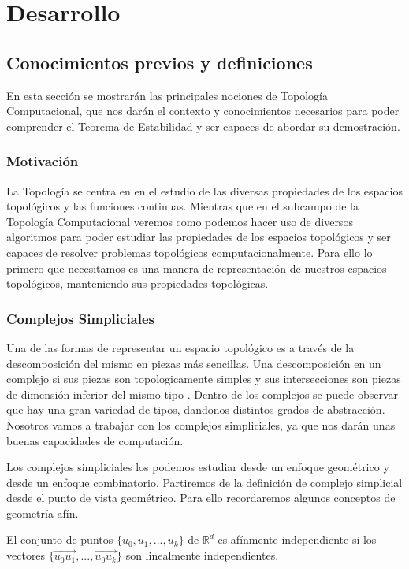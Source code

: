 \chapter{Desarrollo}

\section{Conocimientos previos y definiciones}
En esta sección se mostrarán las principales nociones de Topología Computacional, que nos darán el contexto y conocimientos necesarios para poder comprender el Teorema de Estabilidad y ser capaces de abordar su demostración.

\subsection{Motivación}
La Topología se centra en en el estudio de las diversas propiedades de los espacios topológicos y las funciones continuas. Mientras que en el subcampo de la Topología Computacional veremos como podemos hacer uso de diversos algoritmos para poder estudiar las propiedades de los espacios topológicos y ser capaces de resolver problemas topológicos computacionalmente. Para ello lo primero que necesitamos es una manera de representación de nuestros espacios topológicos, manteniendo sus propiedades topológicas.

\subsection{Complejos Simpliciales}
Una de las formas de representar un espacio topológico es a través de la descomposición del mismo en piezas más sencillas. Una descomposición en un complejo si sus piezas son topologicamente simples y sus intersecciones son piezas de dimensión inferior del mismo tipo \cite{EH}. Dentro de los complejos se puede observar que hay una gran variedad de tipos, dandonos distintos grados de abstracción. Nosotros vamos a trabajar con los complejos simpliciales, ya que nos darán unas buenas capacidades de computación.

Los complejos simpliciales los podemos estudiar desde un enfoque geométrico y desde un enfoque combinatorio. Partiremos de la definición de complejo simplicial desde el punto de vista geométrico. Para ello recordaremos algunos conceptos de geometría afín.

\begin{definition}
El conjunto de puntos $\{u_0, u_1, ..., u_k\}$ de $\mathbb{R}^d$ es afínmente independiente si los vectores $\{\overrightarrow{u_0u_1}, ..., \overrightarrow{u_0u_k}\}$ son linealmente independientes.
\end{definition}


